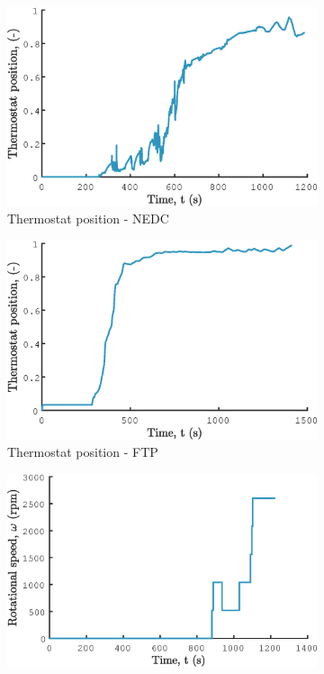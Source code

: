 \begin{figure}[ht]
  \centering
  \begin{subfigure}[b]{0.49\textwidth}
    \includegraphics[width=\textwidth]{figures/model/NEDC/Tstat_pos.eps}
    \caption{Thermostat position - NEDC}
    \label{fig:NEDC_Tstat_pos}
  \end{subfigure}
  \begin{subfigure}[b]{0.49\textwidth}
    \includegraphics[width=\textwidth]{figures/model/FTP/Tstat_pos.eps}
    \caption{Thermostat position - FTP}
    \label{fig:FTP_Tstat_pos}
  \end{subfigure}
  \begin{subfigure}[b]{0.49\textwidth}
    \includegraphics[width=\textwidth]{figures/model/NEDC/fan_speed.eps}

\end{subfigure}
\end{figure}
